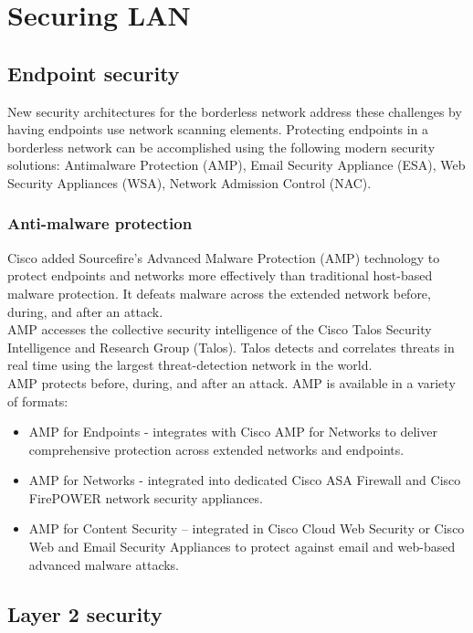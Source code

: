 \chapter{Securing LAN}

\section{Endpoint security}

%
%

New security architectures for the borderless network address these challenges by having endpoints use network scanning elements. Protecting endpoints in a borderless network can be accomplished using the following modern security solutions: Antimalware Protection (AMP), Email Security Appliance (ESA), Web Security Appliances (WSA), Network Admission Control (NAC).\\

\subsection{Anti-malware protection}

Cisco added Sourcefire's Advanced Malware Protection (AMP) technology to protect endpoints and networks more effectively than traditional host-based malware protection. It defeats malware across the extended network before, during, and after an attack.\\

AMP accesses the collective security intelligence of the Cisco Talos Security Intelligence and Research Group (Talos). Talos detects and correlates threats in real time using the largest threat-detection network in the world.\\

AMP protects before, during, and after an attack. AMP is available in a variety of formats:

\begin{itemize}
\item AMP for Endpoints - integrates with Cisco AMP for Networks to deliver comprehensive protection across extended networks and endpoints.
\item AMP for Networks - integrated into dedicated Cisco ASA Firewall and Cisco FirePOWER network security appliances.
\item AMP for Content Security – integrated in Cisco Cloud Web Security or Cisco Web and Email Security Appliances to protect against email and web-based advanced malware attacks.
\end{itemize}

\section{Layer 2 security}